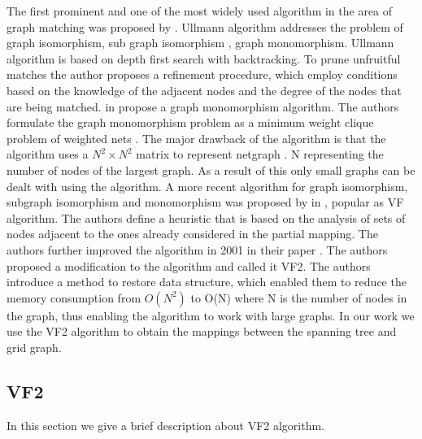 The first prominent and one of the most widely used algorithm in the area of graph matching was proposed by \citeauthor{Ullmann:1976:ASI:321921.321925} \cite{Ullmann:1976:ASI:321921.321925}. Ullmann algorithm addresses the problem of graph isomorphism, sub graph isomorphism , graph monomorphism. Ullmann algorithm is based on  depth first search with backtracking. To prune unfruitful matches the author proposes a refinement procedure, which employ conditions based on the knowledge of the adjacent nodes and the degree of the nodes that are being matched. 
\citeauthor{4308468} in \cite{4308468} propose a graph monomorphism algorithm. The authors formulate the graph monomorphism problem as a minimum weight clique problem of weighted nets . The major drawback of the algorithm is that the algorithm uses a $N^2 \times N^2$ matrix to represent netgraph
. N representing the number of nodes of the largest graph. As a result of this only small graphs can be dealt with using the algorithm.  
A more recent algorithm for graph isomorphism, subgraph isomorphism and monomorphism was proposed by \citeauthor{906251} in \cite{906251}, popular as VF algorithm. The authors define a heuristic that is based on the analysis of sets of nodes adjacent to the ones already considered in the partial mapping. The authors further improved the algorithm in 2001 in their paper \cite{cordella2001improved}. 
The authors proposed a modification to the algorithm and called it VF2. The authors introduce a method to restore data structure, which enabled them to reduce the memory consumption from $O(N^2)$ to O(N) where N is the number of nodes in the graph, thus enabling the algorithm to work with large graphs.
In our work we use the VF2 algorithm to obtain the mappings between the spanning tree and grid graph.

\subsection{VF2}

In this section we give a brief description about VF2 algorithm.\\

